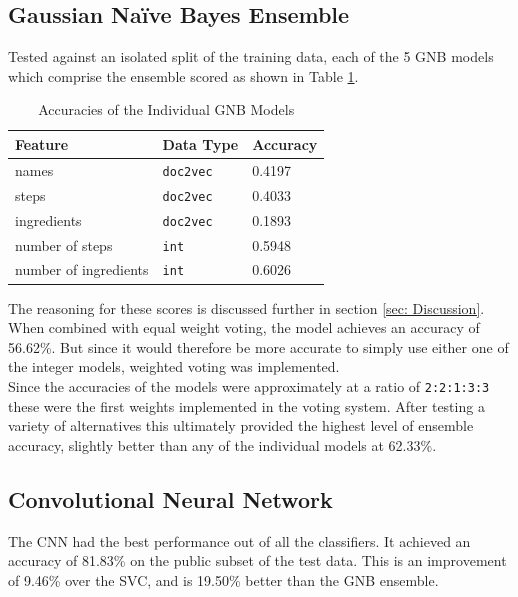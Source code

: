 \documentclass[twocolumn, 11pt]{article}
\begin{document}
\subsection{Gaussian Naïve Bayes Ensemble}
Tested against an isolated split of the training data, each of the 5 GNB models which comprise the ensemble scored as shown in Table \ref{tab: GNB scores}.
\begin{table}[H]
    \centering
    \begin{tabular}{@{}lll@{}}
    \toprule
    Feature               & Data Type & Accuracy \\ \midrule
    names                 & \verb|doc2vec|   & 0.4197   \\
    steps                 & \verb|doc2vec|   & 0.4033   \\
    ingredients           & \verb|doc2vec|   & 0.1893   \\
    number of steps       & \verb|int|       & 0.5948   \\
    number of ingredients & \verb|int|       & 0.6026   \\ \bottomrule
    \end{tabular}
    \caption{Accuracies of the Individual GNB Models}
    \label{tab: GNB scores}
\end{table}
The reasoning for these scores is discussed further in section \ref{sec: Discussion}.\\[2mm]
When combined with equal weight voting, the model achieves an accuracy of 56.62\%. But since it would therefore be more accurate to simply use either one of the integer models, weighted voting was implemented.\\[2mm]
Since the accuracies of the models were approximately at a ratio of \verb|2:2:1:3:3| these were the first weights implemented in the voting system. After testing a variety of alternatives this ultimately provided the highest level of ensemble accuracy, slightly better than any of the individual models at 62.33\%.

\subsection{Convolutional Neural Network}
The CNN had the best performance out of all the classifiers. It achieved an accuracy of 81.83\% on the public subset of the test data. This is an improvement of 9.46\% over the SVC, and is 19.50\% better than the GNB ensemble.
\end{document}

